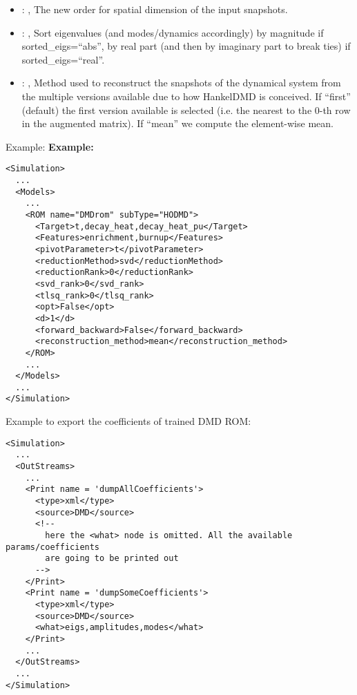 \begin{itemize}
    \item {}: ,
      The new order for spatial dimension of the input snapshots.

    \item {}: ,
      Sort eigenvalues (and modes/dynamics accordingly) by magnitude if sorted\_eigs=``abs'',
      by real part (and then by imaginary part to break ties) if sorted\_eigs=``real''.

    \item {}: ,
      Method used to reconstruct the snapshots of the dynamical system from the multiple versions
      available                                                  due to how HankelDMD is conceived.
      If ``first'' (default) the first version available is selected
      (i.e. the nearest to the 0-th row in the augmented matrix). If ``mean'' we compute the
      element-wise mean.
  \end{itemize}

\hspace{24pt}
Example:
\textbf{Example:}
\begin{lstlisting}[style=XML,morekeywords={name,subType}]
<Simulation>
  ...
  <Models>
    ...
    <ROM name="DMDrom" subType="HODMD">
      <Target>t,decay_heat,decay_heat_pu</Target>
      <Features>enrichment,burnup</Features>
      <pivotParameter>t</pivotParameter>
      <reductionMethod>svd</reductionMethod>
      <reductionRank>0</reductionRank>
      <svd_rank>0</svd_rank>
      <tlsq_rank>0</tlsq_rank>
      <opt>False</opt>
      <d>1</d>
      <forward_backward>False</forward_backward>
      <reconstruction_method>mean</reconstruction_method>
    </ROM>
    ...
  </Models>
  ...
</Simulation>
\end{lstlisting}

Example to export the coefficients of trained DMD ROM:
\begin{lstlisting}[style=XML,morekeywords={name,subType}]
<Simulation>
  ...
  <OutStreams>
    ...
    <Print name = 'dumpAllCoefficients'>
      <type>xml</type>
      <source>DMD</source>
      <!--
        here the <what> node is omitted. All the available params/coefficients
        are going to be printed out
      -->
    </Print>
    <Print name = 'dumpSomeCoefficients'>
      <type>xml</type>
      <source>DMD</source>
      <what>eigs,amplitudes,modes</what>
    </Print>
    ...
  </OutStreams>
  ...
</Simulation>
\end{lstlisting}


